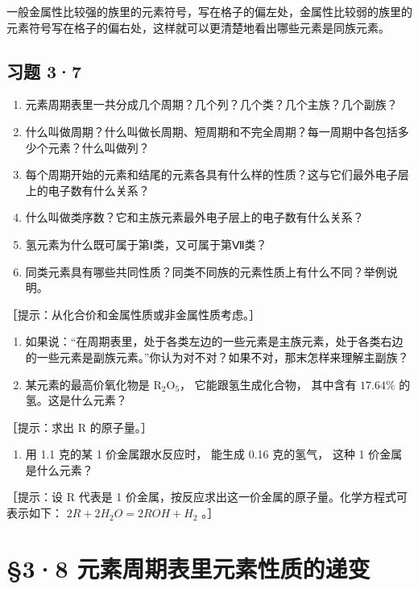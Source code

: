一般金属性比较强的族里的元素符号，写在格子的偏左处，金属性比较弱的族里的元素符号写在格子的偏右处，这样就可以更清楚地看出哪些元素是同族元素。

\subsection{习题 3·7}

\begin{enumerate}
\item
  元素周期表里一共分成几个周期？几个列？几个类？几个主族？几个副族？
\item
  什么叫做周期？什么叫做长周期、短周期和不完全周期？每一周期中各包括多少个元素？什么叫做列？
\item
  每个周期开始的元素和结尾的元素各具有什么样的性质？这与它们最外电子层上的电子数有什么关系？
\item
  什么叫做类序数？它和主族元素最外电子层上的电子数有什么关系？
\item
  氢元素为什么既可属于第Ⅰ类，又可属于第Ⅶ类？
\item
  同类元素具有哪些共同性质？同类不同族的元素性质上有什么不同？举例说明。
\end{enumerate}

［提示：从化合价和金属性质或非金属性质考虑。］

\begin{enumerate}[start=7]
\item
  如果说：``在周期表里，处于各类左边的一些元素是主族元素，处于各类右边的一些元素是副族元素。''你认为对不对？如果不对，那末怎样来理解主副族？
\item
  某元素的最高价氧化物是 \(\mathrm{R}_{2} \mathrm{O}_{5}\)，
  它能跟氢生成化合物， 其中含有 \(17.64 \%\) 的氢。这是什么元素？
\end{enumerate}

［提示：求出 R 的原子量。］

\begin{enumerate}[start=9]
\item
  用 1.1 克的某 1 价金属跟水反应时， 能生成 0.16 克的氢气， 这种 1
  价金属是什么元素？
\end{enumerate}

［提示：设 R 代表是 1
价金属，按反应求出这一价金属的原子量。化学方程式可表示如下：
\(2R + 2H_{2}O = 2ROH + H_{2}\) 。］

\section{§3·8 元素周期表里元素性质的递变}

